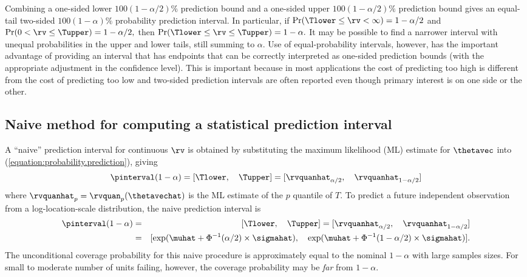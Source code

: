 Combining a one-sided lower $100(1-\alpha/2)\%$ prediction
bound and a one-sided upper 
$100(1-\alpha/2)\%$ prediction
bound gives an equal-tail two-sided $100(1-\alpha)\%$ probability 
prediction interval.  In particular, if $\Pr(\Tlower \leq \rv <
\infty) = 1-\alpha/2$ and $\Pr( 0  < \rv \leq \Tupper) =
1-\alpha/2,$ then $\Pr(\Tlower \leq \rv \leq 	\Tupper) = 1-\alpha.$
It may be possible to find a narrower interval with
unequal probabilities in the upper and lower tails, still summing to
$\alpha$. Use of equal-probability intervals, however, has the
important advantage of providing an interval that has endpoints that
can be correctly interpreted as one-sided prediction bounds (with the
appropriate adjustment in the confidence level).  This is important
because in most applications the cost of predicting too high is
different from the cost of predicting too low and two-sided
prediction intervals
are often reported even though primary interest is on one side or the
other.

\subsection{Naive method for computing a statistical prediction interval}
A ``naive'' prediction interval for continuous $\rv$ is obtained by
substituting the maximum likelihood (ML) estimate for $\thetavec$
into (\ref{equation:probability.prediction}), giving
\begin{displaymath}
\label{equation:naive.coverage}
	\pinterval(1-\alpha)=[ \Tlower,\quad \Tupper ] =  
[\rvquanhat_{\alpha/2},\quad\rvquanhat_{1-\alpha/2}]
\end{displaymath}
where $\rvquanhat_{p}=\rvquan_{p}(\thetavechat)$ is the ML estimate
of the $p$ quantile of $T$.  To predict a future independent
observation from a log-location-scale distribution, the naive
prediction interval is
\begin{eqnarray}
\nonumber
	\pinterval(1-\alpha)&=&[ \Tlower,\quad \Tupper ] = 
[\rvquanhat_{\alpha/2},\quad\rvquanhat_{1-\alpha/2}]\\
\label{equation:lls.naive.pi}
	&=& [\exp(\muhat + \Phi^{-1}(\alpha/2) \times \sigmahat),\quad
	\exp(\muhat + \Phi^{-1}(1-\alpha/2) \times \sigmahat)].
\end{eqnarray}
The unconditional coverage probability for this naive procedure is
approximately equal to the nominal $1-\alpha$ with large samples
sizes. For small to moderate number of units failing, however, the
coverage probability may be {\em far} from $1-\alpha$.


